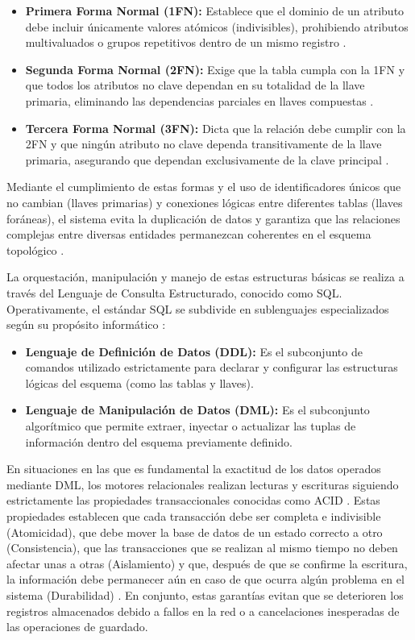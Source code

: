 \begin{itemize}
    \item \textbf{Primera Forma Normal (1FN):} Establece que el dominio de un atributo debe incluir únicamente valores atómicos (indivisibles), prohibiendo atributos multivaluados o grupos repetitivos dentro de un mismo registro \cite{elmasri2007fundamentos}.
    \item \textbf{Segunda Forma Normal (2FN):} Exige que la tabla cumpla con la 1FN y que todos los atributos no clave dependan en su totalidad de la llave primaria, eliminando las dependencias parciales en llaves compuestas \cite{silberschatz2014fundamentos}.
    \item \textbf{Tercera Forma Normal (3FN):} Dicta que la relación debe cumplir con la 2FN y que ningún atributo no clave dependa transitivamente de la llave primaria, asegurando que dependan exclusivamente de la clave principal \cite{elmasri2007fundamentos}.
\end{itemize}

Mediante el cumplimiento de estas formas y el uso de identificadores únicos que no cambian (llaves primarias) y conexiones lógicas entre diferentes tablas (llaves foráneas), el sistema evita la duplicación de datos y garantiza que las relaciones complejas entre diversas entidades permanezcan coherentes en el esquema topológico \cite{sql_avanzado_2022}.

La orquestación, manipulación y manejo de estas estructuras básicas se realiza a través del Lenguaje de Consulta Estructurado, conocido como SQL. Operativamente, el estándar SQL se subdivide en sublenguajes especializados según su propósito informático \cite{silberschatz2014fundamentos}:

\begin{itemize}
    \item \textbf{Lenguaje de Definición de Datos (DDL):} Es el subconjunto de comandos utilizado estrictamente para declarar y configurar las estructuras lógicas del esquema (como las tablas y llaves).
    \item \textbf{Lenguaje de Manipulación de Datos (DML):} Es el subconjunto algorítmico que permite extraer, inyectar o actualizar las tuplas de información dentro del esquema previamente definido.
\end{itemize}

En situaciones en las que es fundamental la exactitud de los datos operados mediante DML, los motores relacionales realizan lecturas y escrituras siguiendo estrictamente las propiedades transaccionales conocidas como ACID \cite{sql_avanzado_2022}. Estas propiedades establecen que cada transacción debe ser completa e indivisible (Atomicidad), que debe mover la base de datos de un estado correcto a otro (Consistencia), que las transacciones que se realizan al mismo tiempo no deben afectar unas a otras (Aislamiento) y que, después de que se confirme la escritura, la información debe permanecer aún en caso de que ocurra algún problema en el sistema (Durabilidad) \cite{sql_avanzado_2022}. En conjunto, estas garantías evitan que se deterioren los registros almacenados debido a fallos en la red o a cancelaciones inesperadas de las operaciones de guardado.

